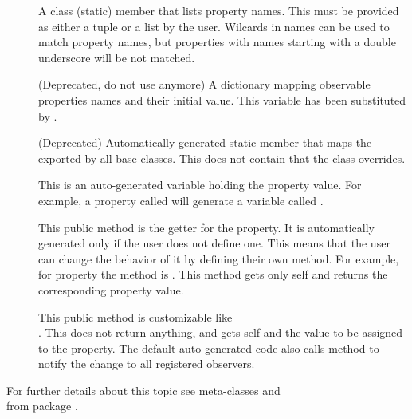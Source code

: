 \begin{description}

\item[\OBSvar] A class (static) member that lists property
  names. This must be provided as either a tuple or a list by the
  user. Wilcards in names can be used to match property names, but
  properties with names starting with a double underscore
  \codename{\_,\_} will be not matched.

\item[\OPvar] (Deprecated, do not use anymore) A dictionary mapping
  observable properties names and their initial value. This
  variable has been substituted by \OBSvar. 

\item[\OPdvar] (Deprecated) Automatically generated static member
  that maps the \OPS exported by all base classes. This does not
  contain \OPS that the class overrides.

\item[] This is an
  auto-generated variable holding the property value. For example,
  a property called  will generate a variable called
  .

\item[] This public method
  is the getter for the property. It is automatically generated only
  if the user does not define one. This means that the user can change
  the behavior of it by defining their own method.  For example, for
  property  the method is .  This
  method gets only self and returns the corresponding property value.

\item[] This public method
  is customizable like \\
  .  This does not return
  anything, and gets self and the value to be assigned to the
  property. The default auto-generated code also calls method
   to notify the
  change to all registered observers.

\end{description}

For further details about this topic see meta-classes 
and \\
 from package .


